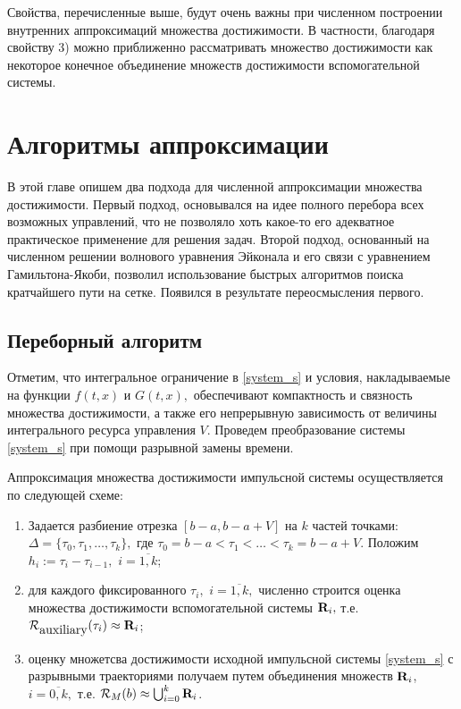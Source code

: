 \documentclass[a4paper,12pt]{article}
\begin{document}
Свойства, перечисленные выше, будут очень важны при численном построении внутренних
аппроксимаций множества достижимости.  В частности, благодаря свойству 3)
можно приближенно рассматривать множество достижимости как
некоторое конечное объединение множеств достижимости вспомогательной
системы.

\section{Алгоритмы аппроксимации}
\label{sec:algrhtms}

В этой главе опишем два подхода для численной аппроксимации множества
достижимости. Первый подход, основывался на идее полного перебора всех
возможных управлений, что не позволяло хоть какое-то его адекватное
практическое применение для решения задач.  Второй подход, основанный
на численном решении волнового уравнения Эйконала и его связи с
уравнением Гамильтона-Якоби, позволил использование быстрых алгоритмов
поиска кратчайшего пути на сетке. Появился в результате переосмысления
первого.

\subsection{Переборный алгоритм}
\label{sec:simple_alg}

Отметим, что интегральное ограничение в
\eqref{system_s} и условия, накладываемые на функции $f(t,x)$ и $G(t,x),$
обеспечивают компактность и связность множества достижимости, а
также его непрерывную зависимость от величины интегрального
ресурса управления $V$. Проведем преобразование системы
\eqref{system_s} при помощи разрывной замены времени. 

Аппроксимация множества достижимости импульсной системы осуществляется по
следующей схеме:
\begin{enumerate}
    \item Задается разбиение отрезка $[b-a,b-a+V]$ на $k$ частей точками:
        $ \Delta=\big\{ \tau_{0}, \tau_{1}, \ldots, \tau_{k} \big\}, $ где
        $\tau_{0}=b-a< \tau_{1}< \ldots < \tau_{k}=b-a+V$. Положим
        $h_i:=\tau_{i}-\tau_{i-1},$ $i=\overline{1,k}$;
    \item для каждого фиксированного $\tau_{i},$ $i=\overline{1,k},$
        численно строится оценка множества достижимости вспомогательной
        системы $\mbox{\bf R}_i ,$ т.е.
        ${\mathcal R}_{\mbox{\rm auxiliary}}(\tau_{i}) \approx \mbox{\bf
        R}_i$;
    \item оценку множетсва достижимости исходной импульсной системы \eqref{system_s} с
        разрывными траекториями получаем путем объединения множеств
        $\mbox{\bf R}_i$, $i=\overline{0,k},$ т.е.
        $ {\mathcal R}_M(b)\approx \bigcup_{i=0}^k \mbox{\bf R}_i$.
\end{enumerate}
\end{document}
